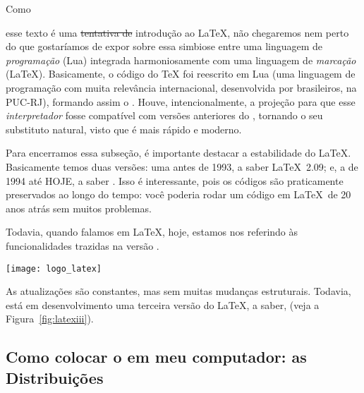 Como 
esse texto é uma \sout{tentativa de} introdução ao \LaTeX, não chegaremos 
nem perto do que gostaríamos de expor sobre essa simbiose entre uma linguagem de 
\textit{programação} (Lua) integrada harmoniosamente com uma linguagem de 
\textit{marcação} (\LaTeX).
Basicamente, o código do \TeX{} foi reescrito em Lua (uma linguagem de programação
com muita relevância internacional, desenvolvida por brasileiros, na PUC-RJ), 
formando assim o .
Houve, intencionalmente, a projeção para que esse \textit{interpretador} fosse 
compatível com versões anteriores do , tornando o  
seu substituto natural, visto que é mais rápido e moderno.

Para encerramos essa subseção, é importante destacar a estabilidade do \LaTeX.
Basicamente temos duas versões: uma antes de 1993, a saber \LaTeX~2.09; e,
a de 1994 até HOJE, a saber .
Isso é interessante, pois os códigos são praticamente preservados ao longo do 
tempo: você poderia rodar um código em \LaTeX\ de 20 anos atrás sem muitos 
problemas.

Todavia, quando falamos em \LaTeX{}, hoje, estamos nos referindo às 
funcionalidades trazidas na versão .

\begin{marginfigure}
  \centering
  \texttt{[image: logo\_latex]}
  \caption{
    Saiba mais sobre esse fantástico projeto no link:
    \href{https://www.latex-project.org}{https://www.latex-project.org}
  }
  \label{fig:latexiii}
\end{marginfigure}

As atualizações são constantes, mas sem muitas mudanças estruturais.
Todavia, está em desenvolvimento uma terceira versão do \LaTeX, a saber, 
 (veja a Figura~\ref{fig:latexiii}).

\subsection{Como colocar o  em meu computador: as Distribuições}

